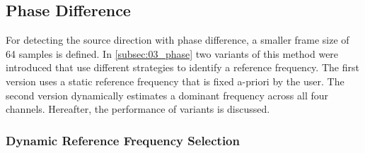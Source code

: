 \subsection{Phase Difference}
\label{subsec:04_phaseSingle}

For detecting the source direction with phase difference, a smaller frame
size of 64 samples is defined.
In \cref{subsec:03_phase} two variants of this method were introduced that use
different strategies to identify a reference frequency. The first version uses
a static reference frequency that is fixed a-priori by the user. The second version
dynamically estimates a dominant frequency across all four channels. Hereafter,
the performance of variants is discussed.


\subsubsection*{Dynamic Reference Frequency Selection}

